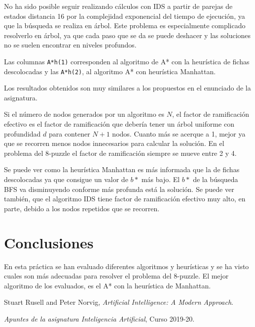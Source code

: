 \documentclass[a4paper, 10pt]{article}
\begin{document}
No ha sido posible seguir realizando cálculos con IDS a partir de parejas de estados distancia 16 por la complejidad exponencial del tiempo de ejecución, ya que la búsqueda se realiza en árbol. Este problema es especialmente complicado resolverlo en árbol, ya que cada paso que se da se puede deshacer y las soluciones no se suelen encontrar en niveles profundos.

Las columnas \texttt{A*h(1)} corresponden al algoritmo de A* con la heurística de fichas descolocadas y las \texttt{A*h(2)}, al algoritmo A* con heurística Manhattan.

Los resultados obtenidos son muy similares a los propuestos en el enunciado de la asignatura. 

Si el número de nodos generados por un algoritmo es $N$, el factor de ramificación efectivo es el factor de ramificación que debería tener un árbol uniforme con profundidad $d$ para contener $N+1$ nodos. Cuanto más se acerque a 1, mejor ya que se recorren menos nodos innecesarios para calcular la solución. En el problema del 8-puzzle el factor de ramificación siempre se mueve entre 2 y 4.

Se puede ver como la heurística Manhattan es más informada que la de fichas descolocadas ya que consigue un valor de $b*$ más bajo. El $b*$ de la búsqueda BFS va disminuyendo conforme más profunda está la solución. Se puede ver también, que el algoritmo IDS tiene factor de ramificación efectivo muy alto, en parte, debido a los nodos repetidos que se recorren.

\section{Conclusiones}
En esta práctica se han evaluado diferentes algoritmos y heurísticas y se ha visto cuales son más adecuadas para resolver el problema del 8-puzzle. El mejor algoritmo de los evaluados, es el A* con la heurística de Manhattan.

\begin{thebibliography}{2}
      Stuart Rusell and Peter Norvig,
      \textit{Artificial Intelligence: A Modern Approach}.

      \bibitem{}
      \textit{Apuntes de la asignatura Inteligencia Artificial}, Curso 2019-20.
      
\end{thebibliography}
\end{document}
